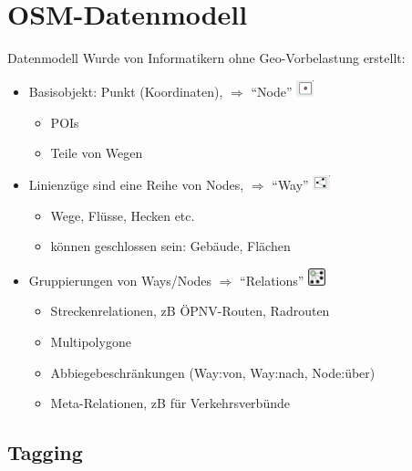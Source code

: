 \documentclass{beamer}
\begin{document}

\section{OSM-Datenmodell}

\begin{frame}{Datenmodell}
Wurde von Informatikern ohne Geo-Vorbelastung erstellt:
\begin{itemize}
  \item Basisobjekt: Punkt (Koordinaten), $\Rightarrow$ "`Node"' \includegraphics[width=0.5cm]{node.png}
  \begin{itemize}
    \item POIs
    \pause
    \item Teile von Wegen
  \end{itemize}
  \item Linienzüge sind eine Reihe von Nodes, $\Rightarrow$ "`Way"' \includegraphics[width=0.5cm]{way.png}
  \begin{itemize}
    \item Wege, Flüsse, Hecken etc.
    \item können geschlossen sein: Gebäude, Flächen
  \end{itemize}
  \pause
  \item Gruppierungen von Ways/Nodes $\Rightarrow$ "`Relations"' \includegraphics[width=0.5cm]{relation.png}
  \begin{itemize}
    \item Streckenrelationen, zB ÖPNV-Routen, Radrouten
    \item Multipolygone
    \item Abbiegebeschränkungen (Way:von, Way:nach, Node:über)
    \item Meta-Relationen, zB für Verkehrsverbünde
  \end{itemize}
\end{itemize}

\end{frame}

\subsection{Tagging}
\end{document}
